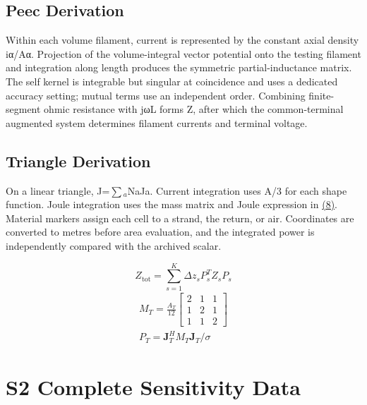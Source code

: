 \documentclass[journal,10pt]{IEEEtran}
\begin{document}
\subsection*{Peec Derivation}
\hypertarget{S1.peec_derivation.heading}{}
Within each volume filament, current is represented by the constant axial density iα/Aα. Projection of the volume-integral vector potential onto the testing filament and integration along length produces the symmetric partial-inductance matrix. The self kernel is integrable but singular at coincidence and uses a dedicated accuracy setting; mutual terms use an independent order. Combining finite-segment ohmic resistance with jωL forms Z, after which the common-terminal augmented system determines filament currents and terminal voltage.


\subsection*{Triangle Derivation}
\hypertarget{S1.triangle_derivation.heading}{}
On a linear triangle, J=\(\sum\)\(_a\)NaJa. Current integration uses A/3 for each shape function. Joule integration uses the mass matrix and Joule expression in \href{paper_en_ieee.pdf#E09}{(8)}. Material markers assign each cell to a strand, the return, or air. Coordinates are converted to metres before area evaluation, and the integrated power is independently compared with the archived scalar.


\hypertarget{E06}{}\begin{equation}Z_{\mathrm{tot}}=\sum_{s=1}^{K}\Delta z_s P_s^T Z_s P_s\tag{7}\label{eq:E06}\end{equation}
\hypertarget{E09}{}
\begin{equation}
\begin{gathered}
M_T=\frac{A_T}{12}\begin{bmatrix}2&1&1\\1&2&1\\1&1&2\end{bmatrix} \\
P_T=\mathbf J_T^H M_T\mathbf J_T/\sigma
\end{gathered}
\tag{8}\label{eq:E09}
\end{equation}
\FloatBarrier
\section*{S2 Complete Sensitivity Data}
\hypertarget{chapter-S2}{}
\end{document}
